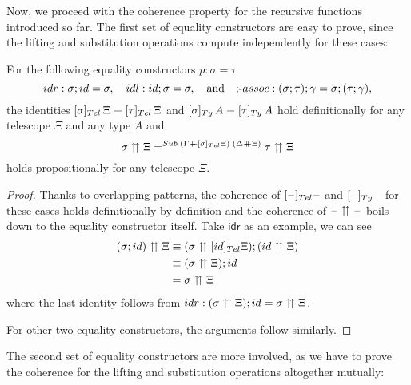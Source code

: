 \documentclass[a4paper,UKenglish,numberwithinsect,cleveref,thm-restate]{lipics-v2021}
\newcommand{\danger}{\marginpar[\hfill\dbend]{\dbend\hfill}}
\begin{document}
Now, we proceed with the coherence property for the recursive functions introduced so far.
The first set of equality constructors are easy to prove, since the lifting and substitution operations compute independently for these cases:
\begin{proposition}[Coherence, I]
  \danger
  For the following equality constructors $p : \sigma = \tau$
  \[
    \mathsf{idr} : \sigma;\idS = \sigma, \quad
    \mathsf{idl} : \idS;\sigma = \sigma, \quad\text{and}\quad
    \textnormal{;-}\mathsf{assoc} : (\sigma;\tau);\gamma = \sigma; (\tau; \gamma), 
  \]
  the identities $[\sigma]_{\Tel}\,\Xi \judgeq [\tau]_{\Tel}\,\Xi$ and $[\sigma ]_{\Ty}\,A \judgeq [\tau ]_{\Ty}\,A$
  hold definitionally for any telescope $\Xi$ and any type $A$ and
  \[
    \sigma \upuparrows \Xi =^{\Sub\;(\Gamma\dplus [\sigma]_{\Tel}\Xi)\;(\Delta\dplus\Xi)}
    \tau   \upuparrows \Xi
  \]
  holds propositionally for any telescope $\Xi$.
\end{proposition}
\begin{proof}
  Thanks to overlapping patterns, the coherence of $[\blank]_{\Tel}\blank$ and $[\blank]_{\Ty}\blank$ for these cases holds definitionally by definition and the coherence of $\mathord{\hspace{1pt}\text{--}\hspace{1pt}} \upuparrows \mathord{\hspace{1pt}\text{--}\hspace{1pt}}$ boils down to the equality constructor itself.
  Take $\mathsf{idr}$ as an example, we can see 
  \begin{align*}
    (\sigma; \idS) \upuparrows \Xi & \judgeq (\sigma \upuparrows [\idS]_{\Tel} \Xi) ; (\idS \upuparrows \Xi) \\
                                   & \judgeq (\sigma \upuparrows \Xi) ; \idS \\
                                   & = \sigma \upuparrows \Xi
  \end{align*}
  where the last identity follows from $\mathsf{idr}:(\sigma \upuparrows \Xi) ; \idS = \sigma \upuparrows \Xi$.

  For other two equality constructors, the arguments follow similarly.
\end{proof}
The second set of equality constructors are more involved, as we have to prove the coherence for the lifting and substitution operations altogether mutually:
\end{document}

